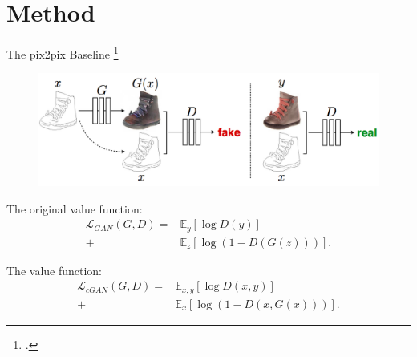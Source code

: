 \documentclass{beamer}
\begin{document}
\section{Method}
\begin{frame}{The pix2pix Baseline \footcite{Image-to-image translation with conditional adversarial networks (CVPR 2017)}}
	\begin{figure}
		\centering
		\includegraphics[height=0.3\textheight]{images/baseline}
	\end{figure}
%
%
\begin{beamerboxesrounded}[upper=uppercol,lower=lowercol,shadow=false]{The original value function:}
	\begin{equation}
	\begin{aligned}
	\mathcal{L}_{GAN}(G,D)=&\mathbb{E}_{y}[\log D(y)]\\+&\mathbb{E}_{z}[\log(1-D(G(z)))].
	\end{aligned}
	\end{equation}
\end{beamerboxesrounded}
%
%
\begin{beamerboxesrounded}[upper=uppercol,lower=lowercol,shadow=false]{The value function:}
\begin{equation}
\begin{aligned}
	\mathcal{L}_{cGAN}(G,D)=&\mathbb{E}_{x,y}[\log D(x,y)]\\+&\mathbb{E}_{x}[\log(1-D(x,G(x)))].
\end{aligned}
\end{equation}
\end{beamerboxesrounded}
\end{frame}
\end{document}
